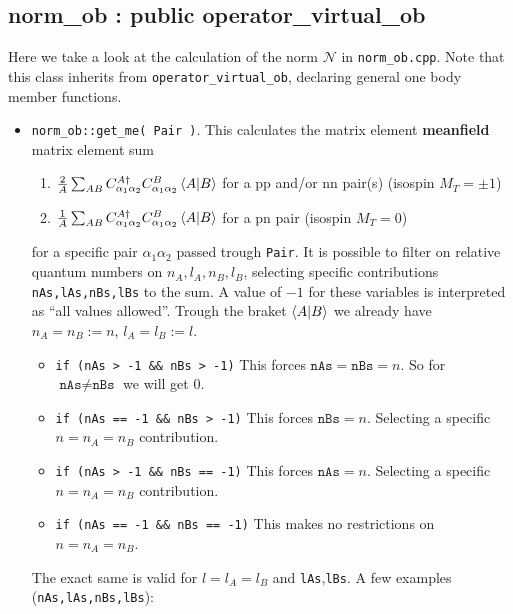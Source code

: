 \documentclass[10pt]{article}
\begin{document}
\subsection{norm\_ob : public operator\_virtual\_ob}
Here we take a look at the calculation of the norm $\mathcal{N}$ in \texttt{norm\_ob.cpp}.
Note that this class inherits from \texttt{operator\_virtual\_ob}, declaring general one body member functions.
\begin{itemize}
	\item \texttt{norm\_ob::get\_me( Pair )}.
		This calculates the matrix element \textbf{meanfield} matrix element sum 
		\begin{enumerate}
		\item $\frac{2}{A} \sum_{ A B } C_{\alpha_1 \alpha_2}^{A \dagger} C_{\alpha_1 \alpha_2}^{B} \braket {A | B }$ for a pp and/or nn pair(s) (isospin $M_T = \pm 1$)
		\item $\frac{1}{A} \sum_{ A B} C_{\alpha_1 \alpha_2}^{A \dagger} C_{\alpha_1 \alpha_2}^{B} \braket {A | B }$ for a pn pair (isospin $M_T = 0$)
	\end{enumerate}
	for a specific pair $\alpha_1 \alpha_2$ passed trough \texttt{Pair}.
		It is possible to filter on relative quantum numbers on $n_A,l_A,n_B,l_B$, selecting specific contributions \texttt{nAs,lAs,nBs,lBs} to the sum. A value of $-1$ for these variables is interpreted as ``all values allowed''. Trough the braket $\braket{ A | B }$ we already have $n_A = n_B := n$, $l_A = l_B := l$.
		\begin{itemize}
			\item \texttt{if (nAs > -1 \&\& nBs > -1)}
				This forces $\texttt{nAs} = \texttt{nBs} = n$. So for $\texttt{nAs} \neq \texttt{nBs}$ we will get $0$.
			\item \texttt{if (nAs == -1 \&\& nBs > -1)}
				This forces $\texttt{nBs} = n$. Selecting a specific $n = n_A = n_B$ contribution.
			\item \texttt{if (nAs > -1 \&\& nBs == -1)}
				This forces $\texttt{nAs} = n$. Selecting a specific $n = n_A = n_B$ contribution.
			\item \texttt{if (nAs == -1 \&\& nBs == -1)}
				This makes no restrictions on $n = n_A = n_B$.
		\end{itemize}
		The exact same is valid for $l = l_A = l_B$ and \texttt{lAs},\texttt{lBs}.
		A few examples (\texttt{nAs,lAs,nBs,lBs}):

\end{itemize}
\end{document}
